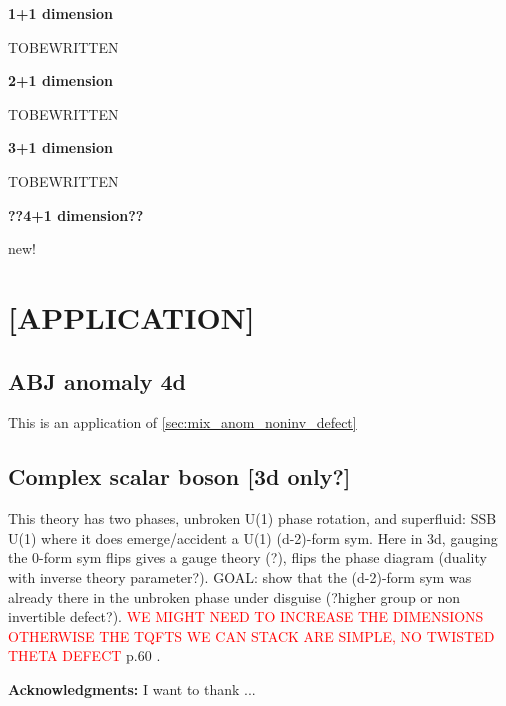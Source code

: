 \documentclass[aps,preprint,nofootinbib,preprintnumbers,eqsecnum,superscriptaddress]{revtex4}
\numberwithin{equation}{section}
\begin{document}
\begin{tcolorbox}

{\bf 1+1 dimension}

TOBEWRITTEN

\end{tcolorbox} 

\begin{tcolorbox}

{\bf 2+1 dimension}

TOBEWRITTEN

\end{tcolorbox} 

\begin{tcolorbox}

{\bf 3+1 dimension}

TOBEWRITTEN

\end{tcolorbox} 

\begin{tcolorbox}

{\bf ??4+1 dimension??}

new!

\end{tcolorbox} 

\section{[APPLICATION]}

\subsection{ABJ anomaly 4d}
This is an application of \ref{sec:mix_anom_noninv_defect}

\subsection{Complex scalar boson [3d only?]}
This theory has two phases, unbroken U(1) phase rotation, and superfluid: SSB U(1) where it does emerge/accident a U(1) (d-2)-form sym. Here in 3d, gauging the 0-form sym flips gives a gauge theory (?), flips the phase diagram (duality with inverse theory parameter?). 
GOAL: show that the (d-2)-form sym was already there in the unbroken phase under disguise (?higher group or non invertible defect?).
\textcolor{red}{WE MIGHT NEED TO INCREASE THE DIMENSIONS OTHERWISE THE TQFTS WE CAN STACK ARE SIMPLE, NO TWISTED THETA DEFECT} p.60 \cite{schafernameki_2023}.

\newpage
 








\newpage
{\bf Acknowledgments:} I want to thank ... 



\end{document}
